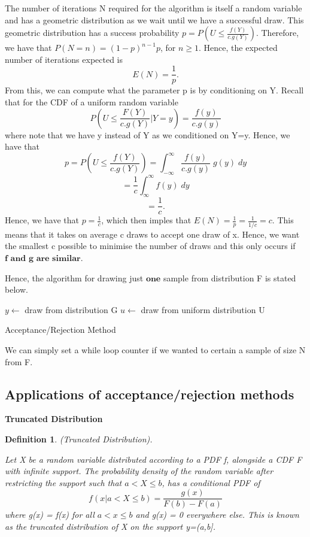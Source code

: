 \documentclass[twoside]{article}
\newtheorem{definition}[theorem]{Definition}
\begin{document}
The number of iterations N required for the algorithm is itself a random variable and has a geometric distribution as we wait until we have a successful draw. This geometric distribution has a success probability $p = P(U \leq \frac{f(Y)}{c.g(Y)})$. Therefore, we have that $P(N=n) = (1-p)^{n-1}p$, for $n \geq 1$. Hence, the expected number of iterations expected is
$$
E(N) = \frac{1}{p}.
$$
From this, we can compute what the parameter p is by conditioning on Y. Recall that for the CDF of a uniform random variable
$$
P(U \leq \frac{F(Y)}{c.g(Y)}|Y=y) = \frac{f(y)}{c.g(y)}
$$
where note that we have y instead of Y as we conditioned on Y=y.  Hence, we have that
$$
p = P(U \leq \frac{f(Y)}{c.g(Y)}) = \int_{- \infty}^{\infty}\frac{f(y)}{c.g(y)}\;g(y)\;dy
$$
$$
= \frac{1}{c}\int_{\infty}^{\infty}f(y)\;dy
$$
$$
= \frac{1}{c}.
$$
Hence, we have that $p = \frac{1}{c}$, which then imples that $E(N) = \frac{1}{p} = \frac{1}{1/c} = c$. This means that it takes on average c draws to accept one draw of x. Hence, we want the smallest c possible to minimise the number of draws and this only occurs if $\textbf{f and g are similar}$.

Hence, the algorithm for drawing just $\textbf{one}$ sample from distribution F is stated below.

\begin{algorithm}
\DontPrintSemicolon
{}
$y \gets $ draw from distribution G\;
$u \gets $ draw from uniform distribution U\;

\;
\caption{{\sc Acceptance/Rejection Method}}
\label{algo:duplicate}
\end{algorithm}

We can simply set a while loop counter if we wanted to certain a sample of size N from F. 

\subsection{Applications of acceptance/rejection methods}

\textbf{Truncated Distribution}


\begin{definition}(Truncated Distribution). 

Let X be a random variable distributed according to a PDF f, alongside a CDF F with infinite support. The probability density of the random variable after restricting the support such that $a < X \leq b$, has a conditional PDF of
$$
f(x|a<X \leq b) = \frac{g(x)}{F(b) - F(a)}
$$
where g(x) = f(x) for all $a < x \leq b$ and g(x) = 0 everywhere else. This is known as the truncated distribution of X on the support y=(a,b].
\end{definition}
\end{document}
